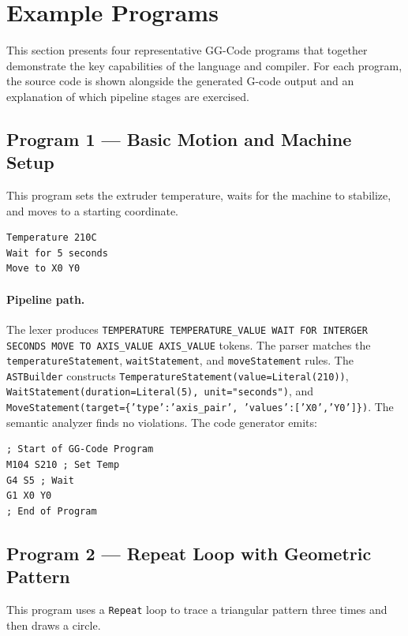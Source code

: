 \section{Example Programs}
\label{sec:examples}

This section presents four representative GG-Code programs that together demonstrate the key capabilities of the language and compiler. For each program, the source code is shown alongside the generated G-code output and an explanation of which pipeline stages are exercised.

\subsection*{Program 1 --- Basic Motion and Machine Setup}

This program sets the extruder temperature, waits for the machine to stabilize, and moves to a starting coordinate.

\begin{verbatim}
Temperature 210C
Wait for 5 seconds
Move to X0 Y0
\end{verbatim}

\paragraph{Pipeline path.}
The lexer produces \texttt{TEMPERATURE TEMPERATURE\_VALUE WAIT FOR INTERGER SECONDS MOVE TO AXIS\_VALUE AXIS\_VALUE} tokens. The parser matches the \texttt{temperatureStatement}, \texttt{waitStatement}, and \texttt{moveStatement} rules. The \texttt{ASTBuilder} constructs \texttt{TemperatureStatement(value=Literal(210))}, \texttt{WaitStatement(duration=Literal(5), unit="seconds")}, and \texttt{MoveStatement(target=\{'type':'axis\_pair', 'values':['X0','Y0']\})}. The semantic analyzer finds no violations. The code generator emits:

\begin{verbatim}
; Start of GG-Code Program
M104 S210 ; Set Temp
G4 S5 ; Wait
G1 X0 Y0
; End of Program
\end{verbatim}

\subsection*{Program 2 --- Repeat Loop with Geometric Pattern}

This program uses a \texttt{Repeat} loop to trace a triangular pattern three times and then draws a circle.

